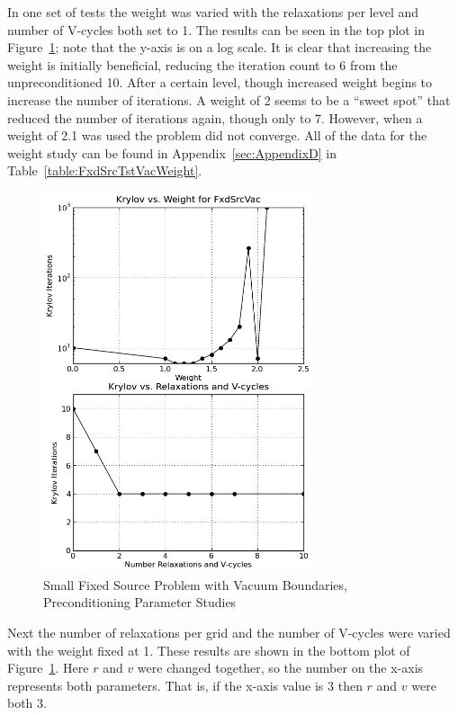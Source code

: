 In one set of tests the weight was varied with the relaxations per level and number of V-cycles both set to 1. The results can be seen in the top plot in Figure~\ref{fig:FxdSrcVac}; note that the y-axis is on a log scale. It is clear that increasing the weight is initially beneficial, reducing the iteration count to 6 from the unpreconditioned 10. After a certain level, though increased weight begins to increase the number of iterations. A weight of 2 seems to be a ``sweet spot'' that reduced the number of iterations again, though only to 7. However, when a weight of 2.1 was used the problem did not converge. All of the data for the weight study can be found in Appendix~\ref{sec:AppendixD} in Table~\ref{table:FxdSrcTstVacWeight}.
%
\begin{figure}[!ht]
    \begin{center}
      \includegraphics [width=0.7\textwidth, height=0.8\textheight] {FxdSrcVac}
   \end{center}
   \caption{Small Fixed Source Problem with Vacuum Boundaries, Preconditioning Parameter Studies}
   \label{fig:FxdSrcVac}
\end{figure}

Next the number of relaxations per grid and the number of V-cycles were varied with the weight fixed at 1. These results are shown in the bottom plot of Figure~\ref{fig:FxdSrcVac}. Here $r$ and $v$ were changed together, so the number on the x-axis represents both parameters. That is, if the x-axis value is 3 then $r$ and $v$ were both 3. 

